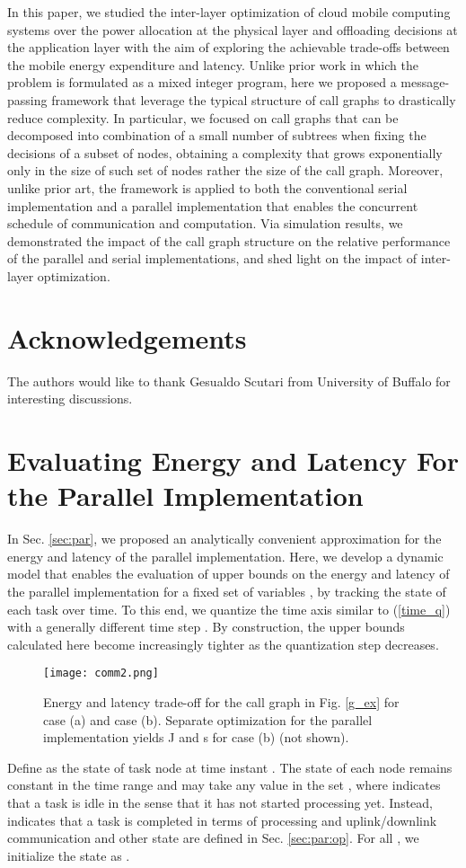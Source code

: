 \documentclass[journal,twocolumn,10pt,twoside]{IEEEtranTCOM}
\theoremstyle{plain}
\theoremstyle{plain}
\theoremstyle{remark}
\begin{document}
In this paper, we studied the inter-layer optimization of cloud mobile computing systems over the power  allocation at the physical layer and offloading decisions at the application layer with the aim of exploring the achievable trade-offs between the mobile energy expenditure and latency. Unlike prior work in which the problem is formulated as a mixed integer program, here we proposed a message-passing framework that leverage the typical structure of call graphs to drastically reduce complexity. In particular, we focused on call graphs that can be decomposed into combination of a small number of subtrees when fixing the decisions of a subset of nodes, obtaining a complexity that grows exponentially only in the size of such set of nodes rather the size of the call graph. Moreover, unlike prior art, the framework is applied to both the conventional serial implementation and a parallel implementation that enables the concurrent schedule of communication and computation. Via simulation results, we demonstrated the impact of the call graph structure on the relative performance of the parallel and serial implementations, and shed light on the impact of inter-layer optimization.
\label{sec:con}


\section{Acknowledgements}

The authors would like to thank Gesualdo Scutari from University of
Buffalo for interesting discussions.


\appendix
\setcounter{secnumdepth}{-1}
\section{Evaluating Energy and Latency For the Parallel Implementation}
\setcounter{secnumdepth}{-1}
\label{app:eva}
In Sec. \ref{sec:par}, we proposed an analytically convenient approximation for the energy and latency of the parallel implementation. Here, we develop a dynamic model that enables the evaluation of upper bounds on the energy and latency of the parallel implementation for a fixed set of variables , by tracking the state of each task over time. To this end, we quantize the time axis similar to (\ref{time_q}) with a generally different time step . By construction, the upper bounds calculated here become increasingly tighter as the quantization step  decreases.

\begin{figure}
\centering
\texttt{[image: comm2.png]}
\caption{Energy and latency trade-off for the call graph  in Fig. \ref{g_ex} for case (a) and case (b). Separate optimization for the parallel implementation yields  J and   s for case (b) (not shown).}\label{no-gain}
\end{figure}
Define as  the state of task node  at time instant . The state of each node remains constant in the time range  and may take any value in the set , where  indicates that a task is idle in the sense that it has not started processing yet. Instead,  indicates that a task is completed in terms of processing and uplink/downlink communication and other state are defined in Sec. \ref{sec:par:op}. For all , we initialize the state as .
\end{document}
